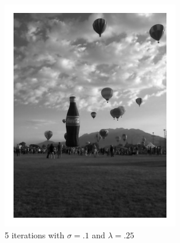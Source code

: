 \begin{figure}[ht]
\begin{minipage}[b]{0.45\linewidth}
\includegraphics[width=\textwidth]{figures/coke_balloon_5iters.pdf}
\caption*{5 iterations with $\sigma = .1$ and $\lambda = .25$}
\end{minipage}
\begin{minipage}[b]{0.45\linewidth}
\centering

\end{minipage}
\end{figure}
